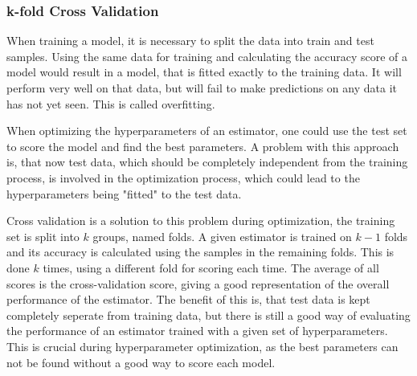 \subsubsection{k-fold Cross Validation}

When training a model, it is necessary to split the data into train and test samples.
Using the same data for training and calculating the accuracy
score of a model would result in a model, that is fitted exactly to the training
data. It will perform very well on that data, but will fail to make predictions on any data
it has not yet seen. This is called overfitting.

When optimizing the hyperparameters of an estimator, one could use the test set to score
the model and find the best parameters. A problem with this approach is, that now test data,
which should be completely independent from the training process,
is involved in the optimization process, which could lead to the hyperparameters being
"fitted" to the test data.

Cross validation is a solution to this problem during optimization, the training set is
split into $k$ groups, named folds. A given estimator is trained on $k-1$ folds and its accuracy
is calculated using the samples in the remaining folds. This is done $k$ times, using a different fold
for scoring each time. The average of all scores is the cross-validation score, giving a good
representation of the overall performance of the estimator.
The benefit of this is, that test data is kept completely seperate from training data, but there
is still a good way of evaluating the performance of an estimator trained with a given set
of hyperparameters. This is crucial during hyperparameter optimization, as the best parameters
can not be found without a good way to score each model.